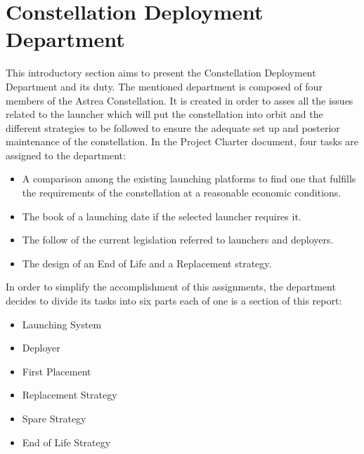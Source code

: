 

\section{Constellation Deployment Department}
This introductory section aims to present the Constellation Deployment Department and its duty. 
\newline
The mentioned department is composed of four members of the Astrea Constellation. It is created in order to asses all the issues related to the launcher which will put the constellation into orbit and the different strategies to be followed to ensure the adequate set up and posterior maintenance of the constellation. 
In the Project Charter document, four tasks are assigned to the department:
\begin{itemize}
\item A comparison among the existing launching platforms to find one that fulfills the requirements of the constellation at a reasonable economic conditions. 
\item The book of a launching date if the selected launcher requires it.
\item The follow of the current legislation referred to launchers and deployers.
\item The design of an End of Life and a Replacement strategy.
\end{itemize}
In order to simplify the accomplishment of this assignments, the department decides to divide its tasks into six parts each of one is a section of this report:
\begin{itemize}
\item Launching System
\item Deployer
\item First Placement
\item Replacement Strategy
\item Spare Strategy
\item End of Life Strategy
\end{itemize}


